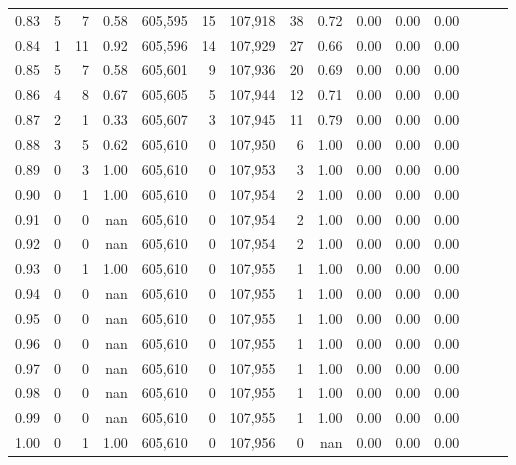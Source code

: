\begin{tabular}{rrrrrrrrrrrrrrr}
0.83 &       5 &      7 &  0.58 &  605,595 &       15 &  107,918 &       38 &  0.72 &  0.00 &  0.00 &      0.00 \\
0.84 &       1 &     11 &  0.92 &  605,596 &       14 &  107,929 &       27 &  0.66 &  0.00 &  0.00 &      0.00 \\
0.85 &       5 &      7 &  0.58 &  605,601 &        9 &  107,936 &       20 &  0.69 &  0.00 &  0.00 &      0.00 \\
0.86 &       4 &      8 &  0.67 &  605,605 &        5 &  107,944 &       12 &  0.71 &  0.00 &  0.00 &      0.00 \\
0.87 &       2 &      1 &  0.33 &  605,607 &        3 &  107,945 &       11 &  0.79 &  0.00 &  0.00 &      0.00 \\
0.88 &       3 &      5 &  0.62 &  605,610 &        0 &  107,950 &        6 &  1.00 &  0.00 &  0.00 &      0.00 \\
0.89 &       0 &      3 &  1.00 &  605,610 &        0 &  107,953 &        3 &  1.00 &  0.00 &  0.00 &      0.00 \\
0.90 &       0 &      1 &  1.00 &  605,610 &        0 &  107,954 &        2 &  1.00 &  0.00 &  0.00 &      0.00 \\
0.91 &       0 &      0 &   nan &  605,610 &        0 &  107,954 &        2 &  1.00 &  0.00 &  0.00 &      0.00 \\
0.92 &       0 &      0 &   nan &  605,610 &        0 &  107,954 &        2 &  1.00 &  0.00 &  0.00 &      0.00 \\
0.93 &       0 &      1 &  1.00 &  605,610 &        0 &  107,955 &        1 &  1.00 &  0.00 &  0.00 &      0.00 \\
0.94 &       0 &      0 &   nan &  605,610 &        0 &  107,955 &        1 &  1.00 &  0.00 &  0.00 &      0.00 \\
0.95 &       0 &      0 &   nan &  605,610 &        0 &  107,955 &        1 &  1.00 &  0.00 &  0.00 &      0.00 \\
0.96 &       0 &      0 &   nan &  605,610 &        0 &  107,955 &        1 &  1.00 &  0.00 &  0.00 &      0.00 \\
0.97 &       0 &      0 &   nan &  605,610 &        0 &  107,955 &        1 &  1.00 &  0.00 &  0.00 &      0.00 \\
0.98 &       0 &      0 &   nan &  605,610 &        0 &  107,955 &        1 &  1.00 &  0.00 &  0.00 &      0.00 \\
0.99 &       0 &      0 &   nan &  605,610 &        0 &  107,955 &        1 &  1.00 &  0.00 &  0.00 &      0.00 \\
1.00 &       0 &      1 &  1.00 &  605,610 &        0 &  107,956 &        0 &   nan &  0.00 &  0.00 &      0.00 \\
\bottomrule
\end{tabular}
